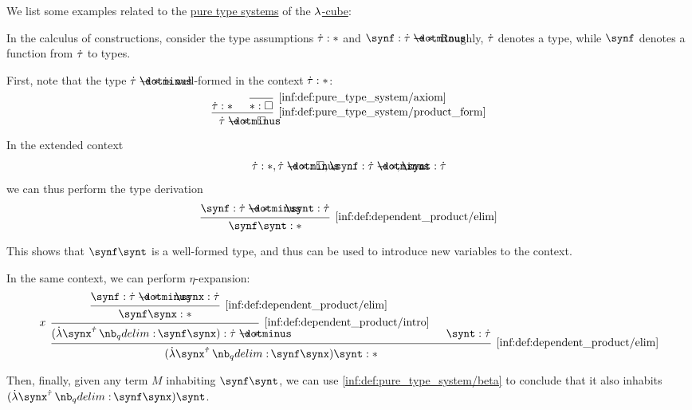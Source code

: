 \begin{example}\label{ex:def:lambda_cube}
  We list some examples related to the \hyperref[def:pure_type_system]{pure type systems} of the \hyperref[def:lambda_cube]{\( {\mathrm \lambda} \)-cube}:
  \begin{thmenum}
     In the calculus of constructions, consider the type assumptions \( \dot{\tau}: {\ast} \) and \( \synf: \syn\tau \synimplies {\ast} \). Roughly, \( \dot{\tau} \) denotes a type, while \( \synf \) denotes a function from \( \dot{\tau} \) to types.

    First, note that the type \( \syn\tau \synimplies {\ast} \) is well-formed in the context \( \dot{\tau}: \ast \):
    \begin{equation*}
      \begin{prooftree}
        \hypo{ \syn\tau: \ast }
        \infer0[\ref{inf:def:pure_type_system/axiom}]{ \ast: \Box }
        \infer2[\ref{inf:def:pure_type_system/product_form}]{ \syn\tau \synimplies {\ast}: \Box }
      \end{prooftree}
    \end{equation*}

    In the extended context
    \begin{equation*}
      \syn\tau: \ast, \syn\tau \synimplies {\ast}: \Box, \synf: \syn\tau \synimplies {\ast}, \synt: \syn\tau
    \end{equation*}
    we can thus perform the type derivation
    \begin{equation*}
      \begin{prooftree}
        \hypo{ \synf: \syn\tau \synimplies {\ast} }
        \hypo{ \synt: \syn\tau }
        \infer2[\ref{inf:def:dependent_product/elim}]{ \synf \synt: {\ast} }.
      \end{prooftree}
    \end{equation*}

    This shows that \( \synf \synt \) is a well-formed type, and thus can be used to introduce new variables to the context.

    In the same context, we can perform \( \eta \)-expansion:
    \begin{equation*}
      \begin{prooftree}
        \hypo{ \synf: \syn\tau \synimplies {\ast} }
        \hypo{ \synx: \syn\tau }
        \infer2[\ref{inf:def:dependent_product/elim}]{ \synf \synx: {\ast} }
        \infer[left label=\( x \)]1[\ref{inf:def:dependent_product/intro}]{ (\qabs {\synx^{\syn\tau}} \synf \synx): \syn\tau \synimplies {\ast} }

        \hypo{ \synt: \syn\tau }

        \infer2[\ref{inf:def:dependent_product/elim}]{ (\qabs {\synx^{\syn\tau}} \synf \synx) \synt: {\ast} }
      \end{prooftree}
    \end{equation*}

    Then, finally, given any term \( M \) inhabiting \( \synf \synt \), we can use \ref{inf:def:pure_type_system/beta} to conclude that it also inhabits \( (\qabs {\synx^{\syn\tau}} \synf \synx) \synt \).
  \end{thmenum}
\end{example}
